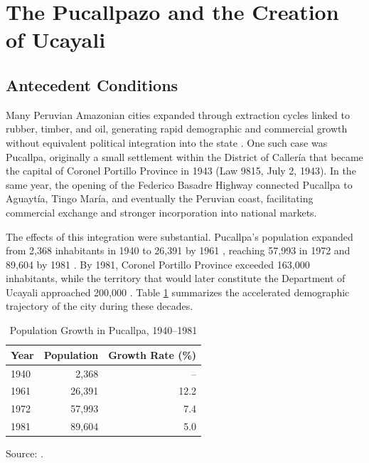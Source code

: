 \documentclass[12pt]{article}
\begin{document}
\section{The Pucallpazo and the Creation of Ucayali}

\subsection{Antecedent Conditions}

Many Peruvian Amazonian cities expanded through extraction cycles linked to rubber, timber, and oil, generating rapid demographic and commercial growth without equivalent political integration into the state \parencite{san_roman_perfiles_1994}. One such case was Pucallpa, originally a small settlement within the District of Callería that became the capital of Coronel Portillo Province in 1943 (Law 9815, July 2, 1943). In the same year, the opening of the Federico Basadre Highway connected Pucallpa to Aguaytía, Tingo María, and eventually the Peruvian coast, facilitating commercial exchange and stronger incorporation into national markets.

The effects of this integration were substantial. Pucallpa’s population expanded from 2,368 inhabitants in 1940 \parencite{departamento_de_censos_censo_1941} to 26,391 by 1961 \parencite{direccion_nacional_de_estadistica_y_censos_v_1965}, reaching 57,993 in 1972 and 89,604 by 1981 \parencite{instituto_nacional_de_estadistica_e_informatica_migraciones_1995,inei_censos_1981}. By 1981, Coronel Portillo Province exceeded 163,000 inhabitants, while the territory that would later constitute the Department of Ucayali approached 200,000 \parencite{barrantes_amazonia_2014,maguina_salinas_esbozo_2016,iziga_nunez_desarrollo_1993}. Table \ref{tab:population_growth} summarizes the accelerated demographic trajectory of the city during these decades.

\begin{table}[H]
\centering
\caption{Population Growth in Pucallpa, 1940--1981}
\label{tab:population_growth}

\begin{minipage}{0.55\textwidth}
\centering

\begin{tabular}{@{}lrr@{}}
\toprule
\textbf{Year} & \textbf{Population} & \textbf{Growth Rate (\%)} \\
\midrule
1940 & 2,368  & -- \\
1961 & 26,391 & 12.2 \\
1972 & 57,993 & 7.4 \\
1981 & 89,604 & 5.0 \\
\bottomrule
\end{tabular}

\vspace{0.2cm}

\raggedright
\footnotesize
Source: \textcite{instituto_nacional_de_estadistica_e_informatica_migraciones_1995}.

\end{minipage}

\end{table}
\end{document}

